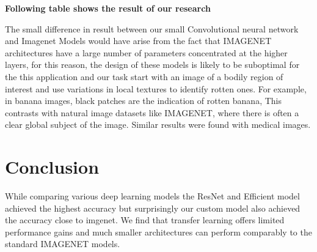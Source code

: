 \documentclass[11pt]{article}
\begin{document}
\textbf{Following table shows the result of our research}




\begin{table}[ht]
\centering
{}

\caption{Research Findings}
\label{tab:customtable}
\end{table}




The small difference in result between our small Convolutional neural network and Imagenet Models would have arise from the fact that IMAGENET architectures have a large number of parameters concentrated at the higher layers, for this reason, the design of these models is likely to be suboptimal for the this application and our task start with an image of a bodily region of interest and use variations in local textures to identify rotten ones. For example, in banana images, black patches are the indication of rotten banana, This contrasts with natural image datasets like IMAGENET, where there is often a clear global subject of the image. Similar results were found with medical images.\cite{transfusion}





\section{Conclusion}
While comparing various deep learning models the ResNet and Efficient model achieved the highest accuracy but surprisingly our custom model also achieved the accuracy close to imgenet. We find that transfer learning offers limited performance gains and much smaller architectures can perform comparably to the standard IMAGENET models.
\printbibliography
\end{document}
